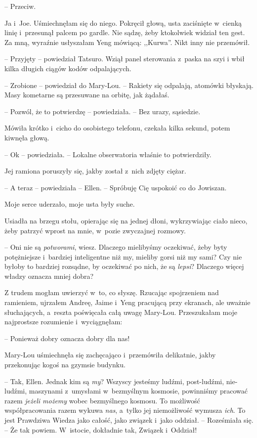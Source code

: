 \documentclass[oneside,polish,11pt,sfheadings]{mwbk}
\begin{document}
-- Przeciw.

Ja i~Joe. Uśmiechnęłam się do niego. Pokręcił głową, usta zaciśnięte w~cienką linię i~przesunął palcem po gardle. Nie sądzę, żeby ktokolwiek
widział ten gest. Za mną, wyraźnie usłyszałam Yeng mówiącą: ,,Kurwa''.
Nikt inny nie przemówił.

-- Przyjęty -- powiedział Tatsuro. Wziął panel sterowania z~paska na szyi
i wbił kilka długich ciągów kodów odpalających.

-- Zrobione -- powiedział do Mary-Lou. -- Rakiety się odpalają, atomówki
błyskają. Masy kometarne są przesuwane na orbitę, jak żądałaś.

-- Pozwól, że to potwierdzę -- powiedziała. -- Bez urazy, sąsiedzie.

Mówiła krótko i~cicho do osobistego telefonu, czekała kilka sekund,
potem kiwnęła głową.

-- Ok -- powiedziała. -- Lokalne obserwatoria właśnie to potwierdziły.

Jej ramiona poruszyły się, jakby został z~nich zdjęty ciężar. 

-- A teraz
-- powiedziała -- Ellen. -- Spróbuję Cię uspokoić co do Jowiszan.

Moje serce uderzało, moje usta były suche.

Usiadła na brzegu stołu, opierając się na jednej dłoni, wykrzywiając
ciało nieco, żeby patrzyć wprost na mnie, w~pozie zwyczajnej rozmowy. 

-- Oni nie są \textit{potworami}, wiesz. Dlaczego mielibyśmy oczekiwać, żeby
byty potężniejsze i~bardziej inteligentne niż my, mieliby gorsi niż my
sami? Czy nie byłoby to bardziej rozsądne, by oczekiwać po nich, że są
\textit{lepsi}? Dlaczego więcej władzy oznacza mniej dobra?

Z trudem mogłam uwierzyć w~to, co słyszę. Rzucając spojrzeniem nad
ramieniem, ujrzałem Andreę, Jaime i~Yeng pracującą przy ekranach, ale
uważnie słuchających, a~reszta poświęcała całą uwagę Mary-Lou.
Przeszukałam moje najprostsze rozumienie i~wyciągnęłam:

-- Ponieważ dobry oznacza dobry dla nas!

Mary-Lou uśmiechnęła się zachęcająco i~przemówiła delikatnie, jakby
przekonując kogoś na gzymsie budynku. 

-- Tak, Ellen. Jednak kim są
\textit{my}? Wszyscy jesteśmy ludźmi, post-ludźmi, nie-ludźmi, maszynami z~umysłami w~bezmyślnym kosmosie, powinniśmy pracować razem \textit{jeżeli
możemy} wobec bezmyślnego kosmosu. To możliwość współpracowania razem
wykuwa \textit{nas}, a~tylko jej niemożliwość wymusza \textit{ich}. To jest
Prawdziwa Wiedza jako całość, jako związek i~jako oddział. -- Roześmiała
się. -- Że tak powiem. W~istocie, dokładnie tak, Związek i~Oddział!
\end{document}
